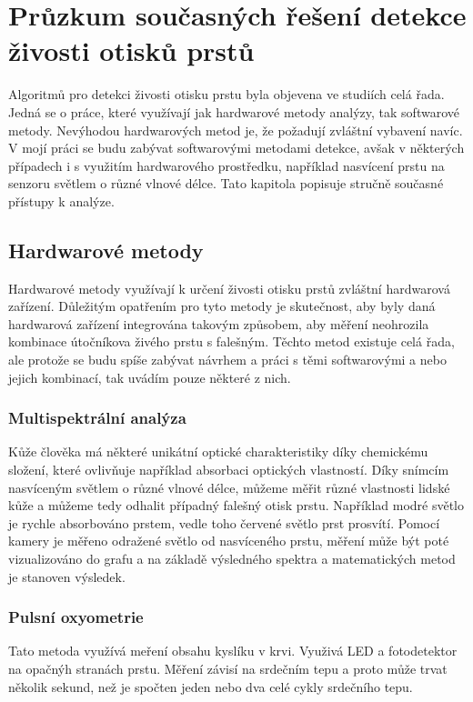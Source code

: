 \chapter{Průzkum současných řešení detekce živosti otisků prstů}
Algoritmů pro detekci živosti otisku prstu byla objevena ve studiích celá řada. Jedná se o práce, které využívají jak hardwarové metody analýzy, tak softwarové metody. Nevýhodou hardwarových metod je, že požadují zvláštní vybavení navíc. V mojí práci se budu zabývat softwarovými metodami detekce, avšak v některých případech i s využitím hardwarového prostředku, například nasvícení prstu na senzoru světlem o různé vlnové délce. Tato kapitola popisuje stručně současné přístupy k analýze.

\section{Hardwarové metody}
Hardwarové metody využívají k určení živosti otisku prstů zvláštní hardwarová zařízení. Důležitým opatřením pro tyto metody je skutečnost, aby byly daná hardwarová zařízení integrována takovým způsobem, aby měření neohrozila kombinace útočníkova živého prstu s falešným. Těchto metod existuje celá řada, ale protože se budu spíše zabývat návrhem a práci s těmi softwarovými a nebo jejich kombinací, tak uvádím pouze některé z nich.
\subsection{Multispektrální analýza}
Kůže člověka má některé unikátní optické charakteristiky díky chemickému složení, které ovlivňuje například absorbaci optických vlastností. Díky snímcím nasvíceným světlem o různé vlnové délce, můžeme měřit různé vlastnosti lidské kůže a můžeme tedy odhalit případný falešný otisk prstu. Například modré světlo je rychle absorbováno prstem, vedle toho červené světlo prst prosvítí. Pomocí kamery je měřeno odražené světlo od nasvíceného prstu, měření může být poté vizualizováno do grafu a na základě výsledného spektra a matematických metod je stanoven výsledek.\cite{AdvancedBiometricsTechnologies2011}
\subsection{Pulsní oxyometrie}
Tato metoda využívá meření obsahu kyslíku v krvi. Využivá LED a fotodetektor na opačnýh stranách prstu. Měření závisí na srdečním tepu a proto může trvat několik sekund, než je spočten jeden nebo dva celé cykly srdečního tepu.\cite{BiometricsEncyclopedia2009}
